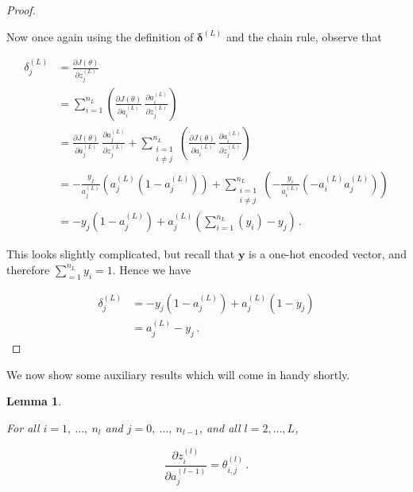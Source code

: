 \documentclass{article}[11pt]
\newtheorem{lemma}{Lemma}
\begin{document}
\begin{proof}
\begin{itemize}
            \end{itemize}
            
            Now once again using the definition of $\boldsymbol{\delta}^{(L)}$ and the chain rule, observe that
            
            $$ \begin{aligned}
            \delta^{(L)}_j &= \frac{\partial J(\theta)}{\partial z^{(L)}_j} \\
            &= \sum_{i=1}^{n_L} \left( \frac{\partial J(\theta)}{\partial a^{(L)}_i} \ \frac{\partial a^{(L)}_i}{\partial z^{(L)}_j} \right) \\
            &= \frac{\partial J(\theta)}{\partial a^{(L)}_j} \ \frac{\partial a^{(L)}_j}{\partial z^{(L)}_j} + \sum_{\substack{i=1 \\ i \neq j}}^{n_L} \left( \frac{\partial J(\theta)}{\partial a^{(L)}_i} \ \frac{\partial a^{(L)}_i}{\partial z^{(L)}_j} \right) \\
            &= - \frac{y_j}{a^{(L)}_j} \left( a^{(L)}_j (1 - a^{(L)}_j) \right) + \sum_{\substack{i=1 \\ i \neq j}}^{n_L} \left( - \frac{y_i}{a^{(L)}_i} \left(- a^{(L)}_i a^{(L)}_j \right) \right) \\
            &= - y_j (1 - a^{(L)}_j) + a^{(L)}_j \left( \sum_{i=1}^{n_L} \left( y_i \right) - y_j \right) \,.
            \end{aligned} $$
            
            This looks slightly complicated, but recall that $\mathbf{y}$ is a one-hot encoded vector, and therefore $\sum_{=1}^{n_L} y_i = 1$. Hence we have
            
            $$ \begin{aligned}
            \delta^{(L)}_j &= - y_j (1 - a^{(L)}_j) + a^{(L)}_j (1 - y_j) \\
            &= a^{(L)}_j - y_j \,.
            \end{aligned} $$
            
        \end{proof}
    
        
        We now show some auxiliary results which will come in handy shortly.
        
        
        \begin{lemma} \label{thm:dz_da}
            
            For all $i = 1, \ \ldots, \ n_l$ and $j = 0, \ \ldots, \ n_{l-1}$, and all $l = 2, \ldots, L$,
            
            $$
            \frac{\partial z^{(l)}_i}{\partial a^{(l-1)}_j} = \theta^{(l)}_{i,j} \,.
            $$
            
        \end{lemma}
        
\end{document}
